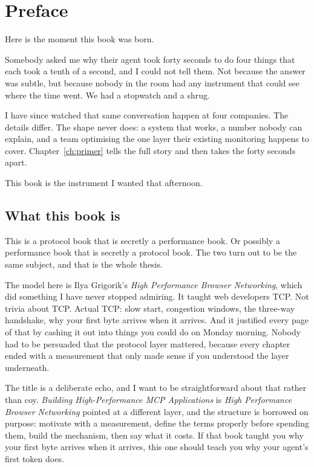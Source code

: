 \chapter*{Preface}

Here is the moment this book was born.

Somebody asked me why their agent took forty seconds to do four things that each
took a tenth of a second, and I could not tell them. Not because the answer was
subtle, but because nobody in the room had any instrument that could see where
the time went. We had a stopwatch and a shrug.

I have since watched that same conversation happen at four companies. The
details differ. The shape never does: a system that works, a number nobody can
explain, and a team optimising the one layer their existing monitoring happens
to cover. Chapter~\ref{ch:primer} tells the full story and then takes the forty
seconds apart.

This book is the instrument I wanted that afternoon.

\section*{What this book is}

This is a protocol book that is secretly a performance book. Or possibly a
performance book that is secretly a protocol book. The two turn out to be the
same subject, and that is the whole thesis.

The model here is Ilya Grigorik's \emph{High Performance Browser Networking},
which did something I have never stopped admiring. It taught web developers TCP.
Not trivia about TCP. Actual TCP: slow start, congestion windows, the three-way
handshake, why your first byte arrives when it arrives. And it justified every
page of that by cashing it out into things you could do on Monday morning.
Nobody had to be persuaded that the protocol layer mattered, because every
chapter ended with a measurement that only made sense if you understood the
layer underneath.

The title is a deliberate echo, and I want to be straightforward about that
rather than coy. \emph{Building High-Performance MCP Applications} is
\emph{High Performance Browser Networking} pointed at a different layer, and the
structure is borrowed on purpose: motivate with a measurement, define the terms
properly before spending them, build the mechanism, then say what it costs. If
that book taught you why your first byte arrives when it arrives, this one
should teach you why your agent's first token does.

